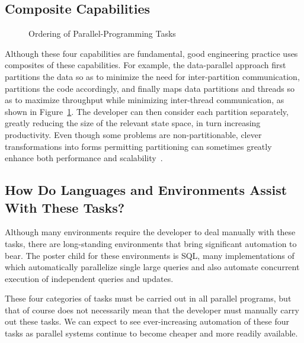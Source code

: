 \subsection{Composite Capabilities}
\label{sec:Composite Capabilities}

\begin{figure}[tb]
\begin{center}
\end{center}
\caption{Ordering of Parallel-Programming Tasks}
\label{fig:intro:Ordering of Parallel-Programming Tasks}
\end{figure}

Although these four capabilities are fundamental,
good engineering practice uses composites of
these capabilities.
For example, the data-parallel approach first
partitions the data so as to minimize the need for
inter-partition communication, partitions the code accordingly,
and finally maps data partitions and threads so as to maximize
throughput while minimizing inter-thread communication,
as shown in
Figure~\ref{fig:intro:Ordering of Parallel-Programming Tasks}.
The developer can then
consider each partition separately, greatly reducing the size
of the relevant state space, in turn increasing productivity.
Even though some problems are non-partitionable,
clever transformations into forms permitting partitioning can
sometimes greatly enhance
both performance and scalability~\cite{PanagiotisMetaxas1999PDCS}.

\subsection{How Do Languages and Environments Assist With These Tasks?}
\label{sec:intro:How Do Languages and Environments Assist With These Tasks?}

Although many environments require the developer to deal manually
with these tasks, there are long-standing environments that bring
significant automation to bear.
The poster child for these environments is SQL, many implementations
of which automatically parallelize single large queries and also
automate concurrent execution of independent queries and updates.

These four categories of tasks must be carried out in all parallel
programs, but that of course does not necessarily mean that the developer
must manually carry out these tasks.
We can expect to see ever-increasing automation of these four tasks
as parallel systems continue to become cheaper and more readily available.

